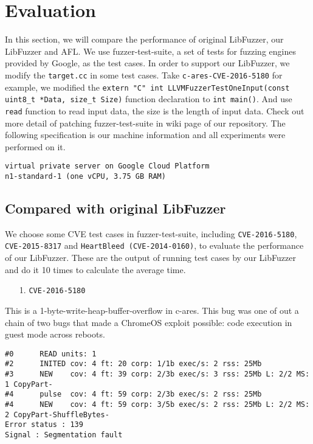 
\section{Evaluation}
\label{sec:eval}

In this section, we will compare the performance of original LibFuzzer, our LibFuzzer and AFL. We use fuzzer-test-suite\cite{fuzzer-test-suite}, a set of tests for fuzzing engines provided by Google, as the test cases. In order to support our LibFuzzer, we modify the \texttt{target.cc} in some test cases. Take \texttt{c-ares-CVE-2016-5180} for example, we modified the \texttt{extern "C" int LLVMFuzzerTestOneInput(const uint8\_t *Data, size\_t Size)} function declaration to \texttt{int main()}. And use \texttt{read} function to read input data, the size is the length of input data. Check out more detail of patching fuzzer-test-suite in wiki page of our repository. The following specification is our machine information and all experiments were performed on it.

\begin{lstlisting}
virtual private server on Google Cloud Platform
n1-standard-1 (one vCPU, 3.75 GB RAM)
\end{lstlisting}

\subsection{Compared with original LibFuzzer}

We choose some CVE test cases in fuzzer-test-suite, including \texttt{CVE-2016-5180}, \texttt{CVE-2015-8317} and \texttt{HeartBleed (CVE-2014-0160)}, to evaluate the performance of our LibFuzzer. These are the output of running test cases by our LibFuzzer and do it 10 times to calculate the average time.

\begin{enumerate}
    \item [1.] \texttt{CVE-2016-5180}
\end{enumerate}

This is a 1-byte-write-heap-buffer-overflow in c-ares. This bug was one of out a chain of two bugs that made a ChromeOS exploit possible: code execution in guest mode across reboots.

\begin{lstlisting}
#0      READ units: 1
#2      INITED cov: 4 ft: 20 corp: 1/1b exec/s: 2 rss: 25Mb
#3      NEW    cov: 4 ft: 39 corp: 2/3b exec/s: 3 rss: 25Mb L: 2/2 MS: 1 CopyPart-
#4      pulse  cov: 4 ft: 59 corp: 2/3b exec/s: 2 rss: 25Mb
#4      NEW    cov: 4 ft: 59 corp: 3/5b exec/s: 2 rss: 25Mb L: 2/2 MS: 2 CopyPart-ShuffleBytes-
Error status : 139
Signal : Segmentation fault
\end{lstlisting}

